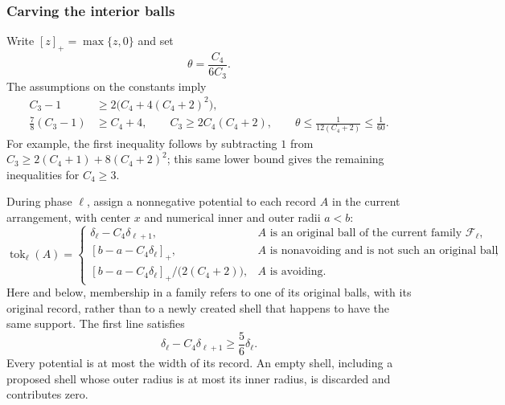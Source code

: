 \subsubsection{Carving the interior balls}
\label{ha:carving}

Write $[z]_+=\max\{z,0\}$ and set
\[
 \theta=\frac{C_4}{6C_3}.
\]
The assumptions on the constants imply
\begin{equation}
 \begin{split}
 C_3-1&\geq 2\bigl(C_4+4(C_4+2)^2\bigr),\\
 \frac78(C_3-1)&\geq C_4+4,\qquad
 C_3\geq 2C_4(C_4+2),\qquad
 \theta\leq\frac1{12(C_4+2)}\leq\frac1{60}.
 \end{split}
 \label{ha:constant-consequences}
\end{equation}
For example, the first inequality follows by subtracting $1$ from
$C_3\geq2(C_4+1)+8(C_4+2)^2$; this same lower bound gives the remaining
inequalities for $C_4\geq3$.

During phase $\ell$, assign a nonnegative potential to each record
$A$ in the current arrangement, with center $x$ and numerical inner
and outer radii $a<b$:
\begin{equation}
 \operatorname{tok}_\ell(A)=
 \begin{cases}
  \delta_\ell-C_4\delta_{\ell+1},
   &A\text{ is an original ball of the current family }\mathcal F_\ell,\\
  [b-a-C_4\delta_\ell]_+,
   &A\text{ is nonavoiding and is not such an original ball},\\
  [b-a-C_4\delta_\ell]_+/\bigl(2(C_4+2)\bigr),
   &A\text{ is avoiding}.
 \end{cases}
 \label{ha:potential}
\end{equation}
Here and below, membership in a family refers to one of its original
balls, with its original record, rather than to a newly created shell
that happens to have the same support.  The first line satisfies
\begin{equation}
 \delta_\ell-C_4\delta_{\ell+1}\geq\frac56\delta_\ell.
 \label{ha:fresh-potential}
\end{equation}
Every potential is at most the width of its record.  An empty shell,
including a proposed shell whose outer radius is at most its inner
radius, is discarded and contributes zero.

